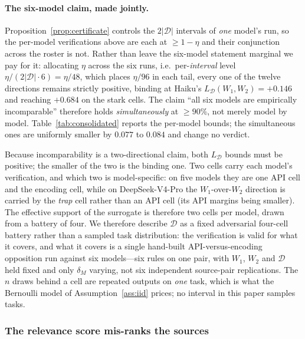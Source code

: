 \documentclass[11pt]{article}
\theoremstyle{plain}
\theoremstyle{definition}
\theoremstyle{remark}
\newcommand{\Dcal}{\mathcal{D}}
\begin{document}
\paragraph{The six-model claim, made jointly.} Proposition~\ref{prop:certificate} controls the
$2|\Dcal|$ intervals of \emph{one} model's run, so the per-model verifications above are each at
$\ge 1-\eta$ and their conjunction across the roster is not. Rather than leave the six-model
statement marginal we pay for it: allocating $\eta$ across the six runs, i.e.\ per-\emph{interval}
level $\eta/(2|\Dcal|\cdot 6)=\eta/48$, which places $\eta/96$ in each tail, every one of the
twelve directions remains strictly positive,
binding at Haiku's $L_{\Dcal}(W_1,W_2)=+0.146$ and reaching $+0.684$ on the stark cells.
The claim ``all six models are empirically incomparable'' therefore holds \emph{simultaneously} at
$\ge 90\%$, not merely model by model. Table~\ref{tab:consolidated} reports the per-model bounds;
the simultaneous ones are uniformly smaller by $0.077$ to $0.084$ and change no verdict.

Because incomparability is a two-directional claim, both $L_{\Dcal}$ bounds must be positive; the
smaller of the two is the binding one. Two cells carry each model's verification, and which two
is model-specific: on five models they are one API cell and the encoding cell, while on
DeepSeek-V4-Pro the $W_1$-over-$W_2$ direction is carried by the \emph{trap} cell rather than an
API cell (its API margins being smaller). The effective support of the surrogate is therefore two
cells per model, drawn from a battery of four. We therefore describe
$\Dcal$ as a fixed adversarial four-cell battery rather than a sampled task distribution: the
verification is valid for what it covers, and what it covers is a single hand-built API-versus-encoding
opposition run against six models---six rules on one pair, with $W_1$, $W_2$ and $\Dcal$ held fixed
and only $\delta_M$ varying, not six independent source-pair replications. The $n$ draws behind a
cell are repeated outputs on \emph{one} task, which is what the Bernoulli model of
Assumption~\ref{ass:iid} prices; no interval in this paper samples tasks.

\subsubsection{The relevance score mis-ranks the sources}
\label{sec:results-misrank}
\end{document}
